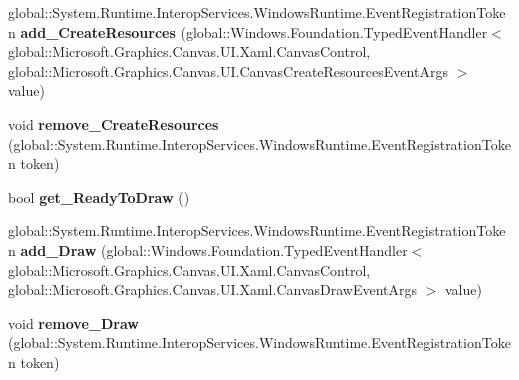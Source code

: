 \begin{DoxyCompactItemize}
global\+::\+System.\+Runtime.\+Interop\+Services.\+Windows\+Runtime.\+Event\+Registration\+Token {\bfseries add\+\_\+\+Create\+Resources} (global\+::\+Windows.\+Foundation.\+Typed\+Event\+Handler$<$ global\+::\+Microsoft.\+Graphics.\+Canvas.\+U\+I.\+Xaml.\+Canvas\+Control, global\+::\+Microsoft.\+Graphics.\+Canvas.\+U\+I.\+Canvas\+Create\+Resources\+Event\+Args $>$ value)
\item 
\mbox{\label{interface_microsoft_1_1_graphics_1_1_canvas_1_1_u_i_1_1_xaml_1_1_i_canvas_control_a48c306eacb3c3028e82658d035cc92b5}} 
void {\bfseries remove\+\_\+\+Create\+Resources} (global\+::\+System.\+Runtime.\+Interop\+Services.\+Windows\+Runtime.\+Event\+Registration\+Token token)
\item 
\mbox{\label{interface_microsoft_1_1_graphics_1_1_canvas_1_1_u_i_1_1_xaml_1_1_i_canvas_control_af948766c9a45fe4b177283cc36deb1ad}} 
bool {\bfseries get\+\_\+\+Ready\+To\+Draw} ()
\item 
\mbox{\label{interface_microsoft_1_1_graphics_1_1_canvas_1_1_u_i_1_1_xaml_1_1_i_canvas_control_aab6814607ac46d5dfa2fdff6dbb0fa3c}} 
global\+::\+System.\+Runtime.\+Interop\+Services.\+Windows\+Runtime.\+Event\+Registration\+Token {\bfseries add\+\_\+\+Draw} (global\+::\+Windows.\+Foundation.\+Typed\+Event\+Handler$<$ global\+::\+Microsoft.\+Graphics.\+Canvas.\+U\+I.\+Xaml.\+Canvas\+Control, global\+::\+Microsoft.\+Graphics.\+Canvas.\+U\+I.\+Xaml.\+Canvas\+Draw\+Event\+Args $>$ value)
\item 
\mbox{\label{interface_microsoft_1_1_graphics_1_1_canvas_1_1_u_i_1_1_xaml_1_1_i_canvas_control_a7d03879a3626825631ff4dd027e13037}} 
void {\bfseries remove\+\_\+\+Draw} (global\+::\+System.\+Runtime.\+Interop\+Services.\+Windows\+Runtime.\+Event\+Registration\+Token token)
\item 
\mbox{\label{interface_microsoft_1_1_graphics_1_1_canvas_1_1_u_i_1_1_xaml_1_1_i_canvas_control_a9b6277e93cd22ec62980077d6054abfa}} 

\end{DoxyCompactItemize}
